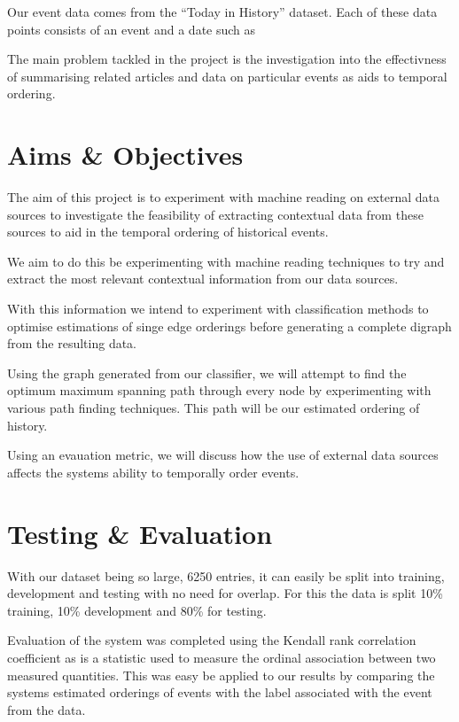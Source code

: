 \documentclass[bsc,frontabs,twoside,singlespacing,parskip,deptreport]{infthesis}     %
\begin{document}
Our event data comes from the ``Today in History'' dataset. Each of these data points consists
of an event and a date such as
\begin{equation}
  [ \text{``Alaska becomes 49th State''}, \text{``1959-01-01''} ]\nonumber
\end{equation}

The main problem tackled in the project is the investigation into the effectivness of
summarising related articles and data on particular
events as aids to temporal ordering. 

\section{Aims \& Objectives}

The aim of this project is to experiment with machine reading on external data sources to
investigate the feasibility of extracting contextual data from these sources to aid in the
temporal ordering of historical events.

We aim to do this be experimenting with machine reading techniques to try and extract the most
relevant contextual information from our data sources.

With this information we intend to experiment with classification methods to optimise estimations
of singe edge orderings before generating a complete digraph from the resulting data.

Using the graph generated from our classifier, we will attempt to find the optimum maximum spanning path
through every node by experimenting with various path finding techniques.
This path will be our estimated ordering of history.


Using an evauation metric, we will discuss how the use of external data sources affects the systems ability to
temporally order events.

\section{Testing \& Evaluation}
With our dataset being so large, 6250 entries, it can
easily be split into training, development and testing with no
need for overlap. For this the data is split 10\% training,
10\% development and 80\% for testing.

Evaluation of the system was completed using the
Kendall rank correlation coefficient as is a statistic
used to measure the ordinal association between two
measured quantities. This was easy be applied to our results
by comparing the systems estimated orderings of events
with the label associated with the event from the data.
\end{document}
